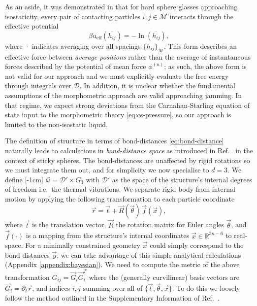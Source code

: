 \documentclass[11pt,twoside]{report}
\begin{document}
As an aside, it was demonstrated in \cite{BritoEEL2006} that for hard sphere glasses approaching isostaticity, every pair of contacting particles $i,j \in \mathcal{M}$ interacts through the effective potential
\begin{equation*}
  \beta u_\mathrm{eff}(\overline{h_{ij}}) = - \ln{(\overline{h_{ij}})},
\end{equation*}
where $\overline{\cdot}$ indicates averaging over all spacings $\{h_{ij}\}_\mathcal{M}$.
This form describes an effective force between \emph{average positions} rather than the average of instantaneous forces described by the potential of mean force $\phi^{(n)}$; as such, the above form is not valid for our approach and we must explicitly evaluate the free energy through integrals over $\mathcal{D}$.
In addition, it is unclear whether the fundamental assumptions of the morphometric approach are valid approaching jamming.
In that regime, we expect strong deviations from the Carnahan-Starling equation of state input to the morphometric theory \eqref{eq:cs-pressure}, so our approach is limited to the non-isostatic liquid.

The definition of structure in terms of bond-distances \eqref{eq:bond-distance} naturally leads to calculations in \emph{bond-distance space} as introduced in Ref.\ \cite{Holmes-CerfonPNAS2013} in the context of sticky spheres.
The bond-distances are unaffected by rigid rotations so we must integrate them out, and for simplicity we now specialise to $d=3$.
We define%
[-1cm]
$\mathcal{Q} = \mathcal{D}' \times G_3$ with $\mathcal{D}'$ as the space of the structure's internal degrees of freedom i.e.\ the thermal vibrations.
We separate rigid body from internal motion by applying the following transformation to each particle coordinate
\begin{equation*}
  \vec{r}
  =
  \vec{t} + \vec{R}(\vec{\theta}) \, \vec{f}(\vec{x}),
\end{equation*}
where $\vec{t}$ is the translation vector, $\vec{R}$ the rotation matrix for Euler angles $\vec{\theta}$, and $\vec{f}(\cdot)$ is a mapping from the structure's internal coordinates $\vec{x} \in \mathbb{R}^{3n-6}$ to real-space.
For a minimally constrained geometry $\vec{x}$ could simply correspond to the bond distances $\vec{y}$; we can take advantage of this simple analytical calculations (Appendix \ref{appendix:bayesian}).
We need to compute the metric of the above transformation $G_{ij} = \vec{G}_i \vec{G}_i^T$ where the (generally curvilinear) basis vectors are $\vec{G}_i = \partial_i \vec{r}$, and indices $i,j$ summing over all of $\{\vec{t}, \vec{\theta}, \vec{x}\}$.
To do this we loosely follow the method outlined in the Supplementary Information of Ref.\ \cite{Holmes-CerfonPNAS2013}.
\end{document}
